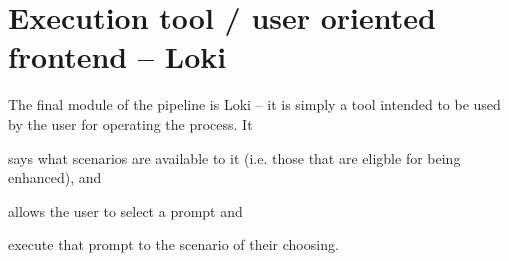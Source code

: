 \section{Execution tool / user oriented frontend -- Loki}


The final module of the \hefe pipeline is Loki -- it is simply a tool intended
to be used by the user for operating the process. It \begin{inparaenum}
\item  says what scenarios are available to it (i.e. those that are eligble for
being enhanced), and 
\item allows the user to select a prompt and 
\item execute that prompt to the scenario of their choosing.
\end{inparaenum}


